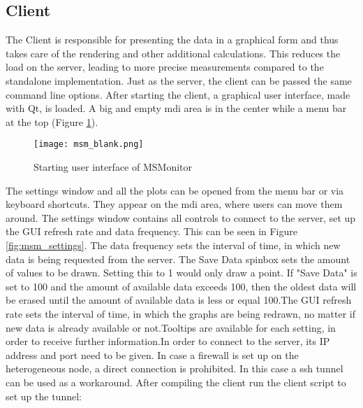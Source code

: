 \subsection{Client}
The Client is responsible for presenting the data in a graphical form and thus takes care of the rendering and other additional calculations. This reduces the load on the server, leading to more precise measurements compared to the standalone implementation.\newline
Just as the server, the client can be passed the same command line options.\newline
After starting the client, a graphical user interface, made with Qt, is loaded. A big and empty mdi area is in the center while a menu bar at the top (Figure \ref{fig:msm_blank}).\newline
\begin{figure}[t!]
	\begin{center}
		\texttt{[image: msm\_blank.png]} 
		\caption{Starting user interface of MSMonitor}
		\label{fig:msm_blank}
	\end{center}
\end{figure}
The settings window and all the plots can be opened from the menu bar or via keyboard shortcuts. They appear on the mdi area, where users can move them around.\newline
The settings window contains all controls to connect to the server, set up the GUI refresh rate and data frequency. This can be seen in Figure \ref{fig:msm_settings}. The data frequency sets the interval of time, in which new data is being requested from the server. The Save Data spinbox sets the amount of values to be drawn. Setting this to 1 would only draw a point. If "Save Data" is set to 100 and the amount of available data exceeds 100, then the oldest data will be erased until the amount of available data is less or equal 100.\newline The GUI refresh rate sets the interval of time, in which the graphs are being redrawn, no matter if new data is already available or not.\newline Tooltips are available for each setting, in order to receive further information.\newline In order to connect to the server, its IP address and port need to be given. In case a firewall is set up on the heterogeneous node, a direct connection is prohibited. In this case a ssh tunnel can be used as a workaround.\newline
After compiling the client run the client script to set up the tunnel:

